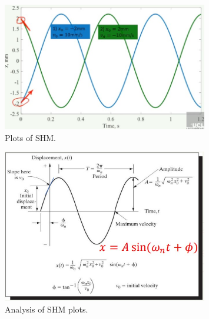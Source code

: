 \documentclass[class=report, crop=false, 12pt,a4paper]{standalone}
\begin{document}
\begin{figure}[H]
    \centering
    \includegraphics[width = 0.8\textwidth]{../img/diagram12.jpg}
    \caption{Plots of SHM.}
\end{figure}
\begin{figure}[H]
    \centering
    \includegraphics[width = 0.8\textwidth]{../img/diagram13.jpg}
    \caption{Analysis of SHM plots.}
\end{figure}
\end{document}
